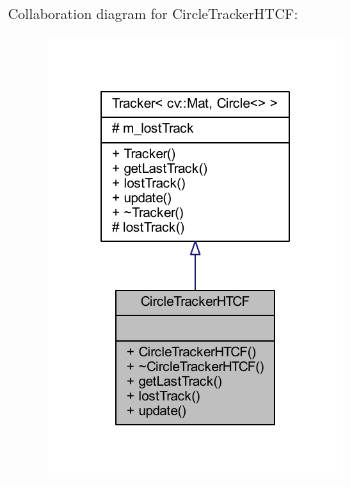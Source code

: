 Collaboration diagram for Circle\+Tracker\+H\+T\+C\+F\+:
\nopagebreak
\begin{figure}[H]
\begin{center}
\leavevmode
\includegraphics[width=221pt]{class_viscv_1_1_circle_tracker_h_t_c_f__coll__graph}
\end{center}
\end{figure}
